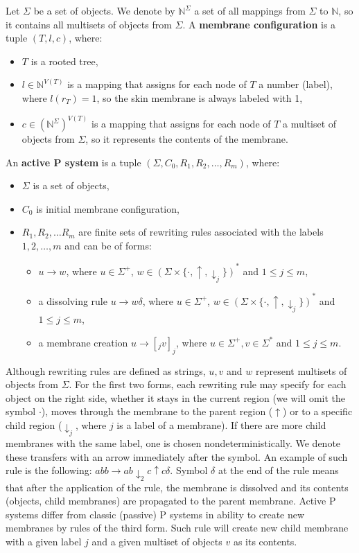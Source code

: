 Let $\Sigma$ be a set of objects. We denote by $\mathbb N^\Sigma$ a set of all mappings from $\Sigma$ to $\mathbb N$, so it contains all multisets of objects from $\Sigma$. A {\bf membrane configuration} is a tuple $(T, l, c)$, where:
\begin{itemize}
  \item $T$ is a rooted tree,
  \item $l\in\mathbb N^{V(T)}$ is a mapping that assigns for each node of $T$ a number (label), where $l(r_T)=1$, so the skin membrane is always labeled with 1,
  \item $c\in(\mathbb N^\Sigma)^{V(T)}$ is a mapping that assigns for each node of $T$ a multiset of objects from $\Sigma$, so it represents the contents of the membrane.
\end{itemize}

An {\bf active P system} is a tuple $(\Sigma, C_0, R_1, R_2, \dots , R_m)$, where:
\begin{itemize}
  \item $\Sigma$ is a set of objects,
  \item $C_0$ is initial membrane configuration,
  \item $R_1,R_2,\dots R_m$ are finite sets of rewriting rules associated with the labels $1,2,\dots,m$ and can be of forms:
  \begin{itemize}
    \item $u\rightarrow w$, where $u\in \Sigma^+$, $w\in (\Sigma\times\{\cdot, \uparrow, \downarrow_j\})^*$ and $1\leq j\leq m$,
    \item a dissolving rule $u\rightarrow w\delta$, where $u\in \Sigma^+$, $w\in (\Sigma\times\{\cdot, \uparrow, \downarrow_j\})^*$ and $1\leq j\leq m$,
    \item a membrane creation $u\rightarrow [_j v]_j$, where $u\in \Sigma^+, v\in \Sigma^*$ and $1\leq j\leq m$.
  \end{itemize}
\end{itemize}

Although rewriting rules are defined as strings, $u,v$ and $w$ represent multisets of objects from $\Sigma$. For the first two forms, each rewriting rule may specify for each object on the right side, whether it stays in the current region (we will omit the symbol $\cdot$), moves through the membrane to the parent region ($\uparrow$)
or to a specific child region ($\downarrow_j$, where $j$ is a label of a membrane). If there are more child membranes with the same label, one is chosen nondeterministically.
We denote these transfers with an arrow immediately after the symbol.
An example of such rule is the following: $abb\rightarrow ab\downarrow_2 c\uparrow c\delta$.
Symbol $\delta$ at the end of the rule means that after the application of the rule, the membrane is dissolved and its contents (objects, child membranes) are propagated to the parent membrane.
Active P systems differ from classic (passive) P systems in ability to create new membranes by rules of the third form. Such rule will create new child membrane with a given label $j$ and a given multiset of objects $v$ as its contents.


